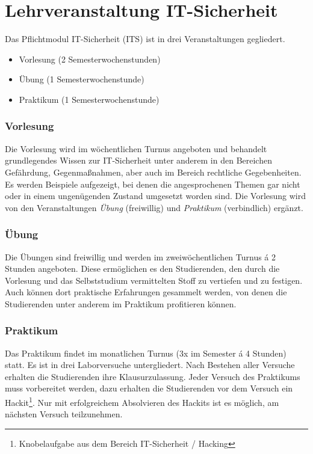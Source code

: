 \section{Lehrveranstaltung IT-Sicherheit} \label{sec:Lehrveranstaltung_IT-Sicherheit}

Das Pflichtmodul IT-Sicherheit (ITS) ist in drei Veranstaltungen gegliedert. \cite[S.30]{hochschuleniederrheinModulhandbuchVollzeitBA2019}
\begin{itemize}
	\item Vorlesung (2 Semesterwochenstunden)
	\item Übung (1 Semesterwochenstunde)
	\item Praktikum (1 Semesterwochenstunde)
\end{itemize}

\subsubsection{Vorlesung}
Die Vorlesung wird im wöchentlichen Turnus angeboten und behandelt grundlegendes Wissen zur IT-Sicherheit unter anderem in den Bereichen Gefährdung, Gegenmaßnahmen, aber auch im Bereich rechtliche Gegebenheiten. Es werden Beispiele aufgezeigt, bei denen die angesprochenen Themen gar nicht oder in einem ungenügenden Zustand umgesetzt worden sind. Die Vorlesung wird von den Veranstaltungen \textit{Übung} (freiwillig) und \textit{Praktikum} (verbindlich) ergänzt.

\subsubsection{Übung}
Die Übungen sind freiwillig und werden im zweiwöchentlichen Turnus á 2 Stunden angeboten. Diese ermöglichen es den Studierenden, den durch die Vorlesung und das Selbststudium vermittelten Stoff zu vertiefen und zu festigen. Auch können dort praktische Erfahrungen gesammelt werden, von denen die Studierenden unter anderem im Praktikum profitieren können.

\subsubsection{Praktikum}
Das Praktikum findet im monatlichen Turnus (3x im Semester á 4 Stunden) statt. Es ist in drei Laborversuche untergliedert. Nach Bestehen aller Versuche erhalten die Studierenden ihre Klausurzulassung. Jeder Versuch des Praktikums muss vorbereitet werden, dazu erhalten die Studierenden vor dem Versuch ein Hackit\footnote{Knobelaufgabe aus dem Bereich IT-Sicherheit / Hacking}. Nur mit erfolgreichem Absolvieren des Hackits ist es möglich, am nächsten Versuch teilzunehmen. \cite{quadePraktikumITSecurity2017}
